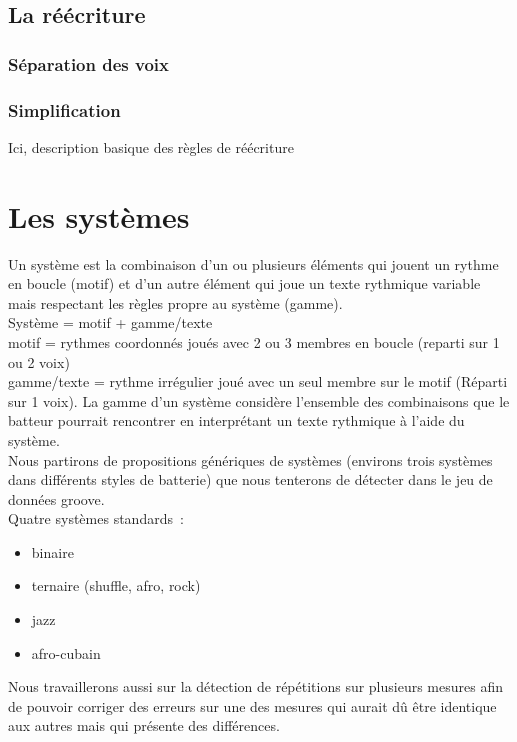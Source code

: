\subsection*{La réécriture}
\subsubsection{Séparation des voix}
\subsubsection{Simplification}
Ici, description basique des règles de réécriture 
\section{Les systèmes}
\label{systemes_methodes}
Un système est la combinaison d’un ou plusieurs éléments qui jouent un rythme en boucle (motif) et d’un autre élément qui joue un texte rythmique variable mais respectant les règles propre au système (gamme).\\

Système = motif + gamme/texte\\
motif = rythmes coordonnés joués avec 2 ou 3 membres en boucle (reparti sur 1 ou 2 voix)\\
gamme/texte = rythme irrégulier joué avec un seul membre sur le motif (Réparti sur 1 voix). La gamme d’un système considère l’ensemble des combinaisons que le batteur pourrait rencontrer en interprétant un texte rythmique à l’aide du système.\\

Nous partirons de propositions génériques de systèmes (environs trois systèmes dans différents styles de batterie) que nous tenterons de détecter dans le jeu de données groove.\\

Quatre systèmes standards :
\begin{itemize}
	\item binaire
	\item ternaire (shuffle, afro, rock)
	\item jazz
	\item afro-cubain\\
\end{itemize}

Nous travaillerons aussi sur la détection de répétitions sur plusieurs mesures afin de pouvoir corriger des erreurs sur une des mesures qui aurait dû être identique aux autres mais qui présente des différences.

